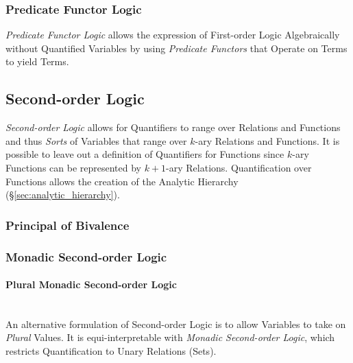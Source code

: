 \subsubsection{Predicate Functor Logic}\label{sec:pfl}

\emph{Predicate Functor Logic} allows the expression of First-order
Logic Algebraically without Quantified Variables by using
\emph{Predicate Functors} that Operate on Terms to yield Terms.



\subsection{Second-order Logic}\label{sec:secondorder_logic}

\emph{Second-order Logic} allows for Quantifiers to range over
Relations and Functions and thus \emph{Sorts} of Variables that range
over $k$-ary Relations and Functions. It is possible to leave out a
definition of Quantifiers for Functions since $k$-ary Functions can be
represented by $k+1$-ary Relations.\cite{shapiro00} Quantification
over Functions allows the creation of the Analytic Hierarchy
(\S\ref{sec:analytic_hierarchy}).



\subsubsection{Principal of Bivalence}\label{sec:bivalence_principal}

\subsubsection{Monadic Second-order Logic}\label{sec:monadic_secondorder}

\paragraph{Plural Monadic Second-order Logic}
\label{sec:plural_monadic_secondorder}\hfill \\

An alternative formulation of Second-order Logic is to allow Variables
to take on \emph{Plural} Values. It is equi-interpretable with
\emph{Monadic Second-order Logic}, which restricts Quantification to
Unary Relations (Sets).



